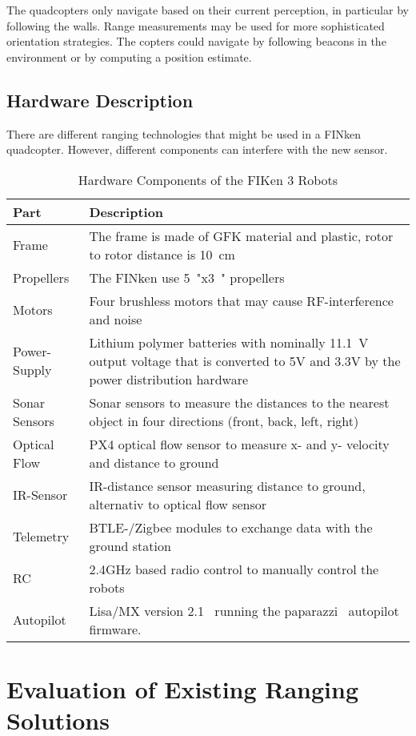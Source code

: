 The quadcopters only navigate based on their current perception, in particular by following the walls.
Range measurements may be used for more sophisticated orientation strategies.
The copters could navigate by following beacons in the environment or by computing a position estimate.

\subsection{Hardware Description}
There are different ranging technologies that might be used in a FINken quadcopter.
However, different components can interfere with the new sensor.

\begin{table}[h]
	\begin{tabularx}{\columnwidth}{l | X}
	Part & Description \\ \hline
	Frame & The frame is made of GFK material and plastic, rotor to rotor distance is \SI{10}{\centi\metre} \\
	Propellers & The FINken use \SI{5}{"}x\SI{3}{"} propellers \\
	Motors & Four brushless motors that may cause RF-interference and noise \\
	Power-Supply & Lithium polymer batteries with nominally \SI{11.1}{\volt} output voltage that is converted to 5V and 3.3V by the power distribution hardware \\
	Sonar Sensors & Sonar sensors to measure the distances to the nearest object in four directions (front, back, left, right) \\
	Optical Flow & PX4 optical flow sensor to measure x- and y- velocity and distance to ground \\
	IR-Sensor & IR-distance sensor measuring distance to ground, alternativ to optical flow sensor \\
	Telemetry & BTLE-/Zigbee modules to exchange data with the ground station \\
	RC &  2.4GHz based radio control to manually control the robots \\
	Autopilot & Lisa/MX version 2.1~\cite{lisamx} running the paparazzi~\cite{paparazzi} autopilot firmware.
	\end{tabularx}
	\caption{Hardware Components of the FIKen 3 Robots}
\end{table}

\section{Evaluation of Existing Ranging Solutions}


